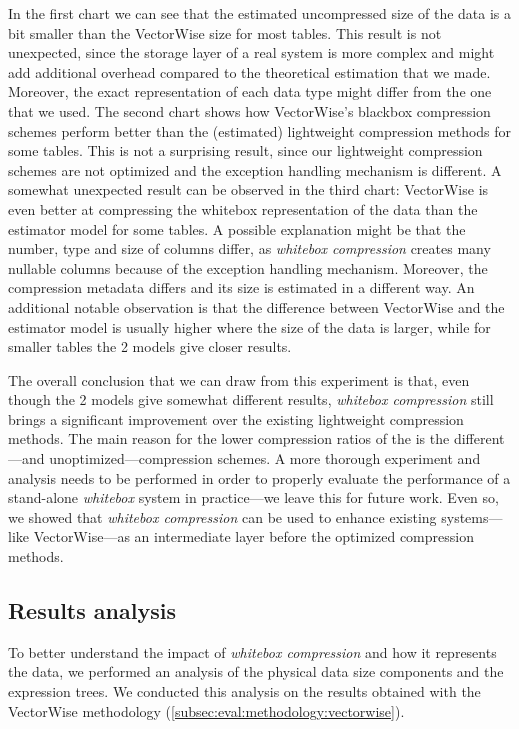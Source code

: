 In the first chart we can see that the estimated uncompressed size of the data is a bit smaller than the VectorWise size for most tables. This result is not unexpected, since the storage layer of a real system is more complex and might add additional overhead compared to the theoretical estimation that we made. Moreover, the exact representation of each data type might differ from the one that we used. The second chart shows how VectorWise's blackbox compression schemes perform better than the (estimated) lightweight compression methods for some tables. This is not a surprising result, since our lightweight compression schemes are not optimized and the exception handling mechanism is different. A somewhat unexpected result can be observed in the third chart: VectorWise is even better at compressing the whitebox representation of the data than the estimator model for some tables. A possible explanation might be that the number, type and size of columns differ, as \textit{whitebox compression} creates many nullable columns because of the exception handling mechanism. Moreover, the compression metadata differs and its size is estimated in a different way. An additional notable observation is that the difference between VectorWise and the estimator model is usually higher where the size of the data is larger, while for smaller tables the 2 models give closer results.

The overall conclusion that we can draw from this experiment is that, even though the 2 models give somewhat different results, \textit{whitebox compression} still brings a significant improvement over the existing lightweight compression methods. The main reason for the lower compression ratios of the  is the different---and unoptimized---compression schemes. A more thorough experiment and analysis needs to be performed in order to properly evaluate the performance of a stand-alone \textit{whitebox} system in practice---we leave this for future work. Even so, we showed that \textit{whitebox compression} can be used to enhance existing systems---like VectorWise---as an intermediate layer before the optimized compression methods.



\subsection{Results analysis}
\label{subsec:eval:results:analysis}

To better understand the impact of \textit{whitebox compression} and how it represents the data, we performed an analysis of the physical data size components and the expression trees. We conducted this analysis on the results obtained with the VectorWise methodology (\ref{subsec:eval:methodology:vectorwise}).

